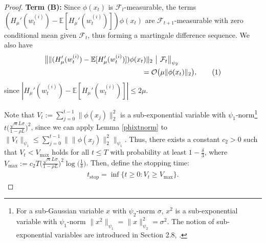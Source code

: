 \documentclass[letterpaper,10pt,conference]{ieeeconf}
\newcommand\numberthis{\addtocounter{equation}{1}\tag{\theequation}}
\theoremstyle{plain} %
\theoremstyle{plain} %
\theoremstyle{plain} %
\theoremstyle{plain}
\begin{document}
\begin{proof}
\medskip
\textbf{Term (B): } 
Since $\phi(x_t)$ is $\mathcal{F}_t$-measurable, the terms 
$(H_\mu'(w_t^{(i)})-\mathbb{E}[H_\mu'(w_t^{(i)})]) \phi(x_t)$ are $\mathcal{F}_{t+1}$-measurable with zero conditional mean given $\mathcal{F}_t$, thus forming a martingale difference sequence. 
We also have
\begin{align*}
  &\bigr\|  \|(H_\mu'(w_t^{(i)})-\mathbb{E}[H_\mu'(w_t^{(i)})]) \phi(x_t)\|_2~\bigr|~\mathcal{F}_t\bigr\|_{\psi_2} \\&\hspace{48mm}=\mathcal{O} \bigr(\mu \|\phi(x_t)\|_2\bigr),\numberthis\label{2muphi}
\end{align*}
 since $|H_\mu'(w_t^{(i)})-\mathbb{E}[H_\mu'(w_t^{(i)})]|\le 2\mu$. 

Note that $V_t:= \sum_{j=0}^{t-1}  \|\phi(x_j)\|_2^2$ is a sub-exponential variable with $\psi_1$-norm\footnote{For a sub-Gaussian variable $x$ with $\psi_2$-norm $\sigma$, $x^2$ is a sub-exponential variable with $\psi_1$-norm $\|x^2\|_{\psi_1} = \|x\|_{\psi_2}^2=\sigma^2$. The notion of sub-exponential variables are introduced in Section 2.8, \cite{vershynin2025high}.} $t\bigr(\frac{  \sqrt{n}L\sigma}{1-\rho L}\bigr)^2$, since we can apply Lemma \ref{phixtnorm} to $\|V_t\|_{\psi_1} \le \sum_{j=0}^{t-1}  \| \|\phi(x_j)\|_2^2 \|_{\psi_1}$. Thus, there exists a constant $c_2>0$ such that $V_t <  V_\text{max}$ holds for all $t\le T$ with probability at least $1-\frac{\delta}{3}$, where $V_{\text{max}}:= c_2 T\bigr(\frac{  \sqrt{n}L\sigma}{1-\rho L}\bigr)^2 \log\bigr(\frac{1}{\delta}\bigr)$. Then, define the stopping time:
\begin{align}\label{stoppingtime}
    t_{\text{stop}} = \inf\{t\ge 0: V_t\ge  V_{\text{max}}\}.
\end{align}


\end{proof}
\end{document}
